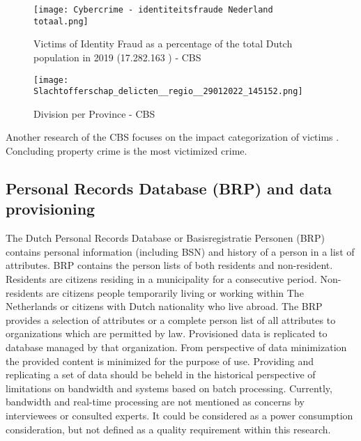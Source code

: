     
    \begin{figure}
        \graphicspath{ {./images/} }
        \texttt{[image: Cybercrime - identiteitsfraude Nederland totaal.png]}\\
        \caption{Victims of Identity Fraud \cite{CBS_IDFraudTable} as a percentage of the total Dutch population in 2019 (17.282.163 \cite{CBS_totalpopulation2019}) - CBS}  
        \label{fig:CBS_Total_ID_fraud}
    \end{figure}

    
    \begin{figure}
        \graphicspath{ {./images/} }
        \texttt{[image: Slachtofferschap\_delicten\_\_regio\_\_29012022\_145152.png]}\\
        \caption{Division per Province  \cite{CBS_IDFraudTable} - CBS}  
        \label{fig:CBS_ID_fraud}
    \end{figure}

Another research of the CBS focuses on the impact categorization of victims {\cite{CBS_casualtiesDigitalCrime}}. Concluding property crime is the most victimized crime. 

\subsection{Personal Records Database (BRP) and data provisioning}\label{BRP}
The Dutch Personal Records Database or Basisregistratie Personen (BRP) contains personal information (including BSN) and history of a person in a list of attributes. BRP contains the person lists of both residents and non-resident. Residents are citizens residing in a municipality for a consecutive period. Non-residents are citizens people temporarily living or working within The Netherlands or citizens with Dutch nationality who live abroad. \cite{BRP} The BRP provides a selection of attributes or a complete person list of all attributes to organizations which are permitted by law. Provisioned data is replicated to database managed by that organization. From perspective of data minimization the provided content is minimized for the purpose of use.  
Providing and replicating a set of data should be beheld in the historical perspective of limitations on bandwidth and systems based on batch processing. Currently, bandwidth and real-time processing are not mentioned as concerns by interviewees or consulted experts. It could be considered as a power consumption consideration, but not defined as a quality requirement within this research.

